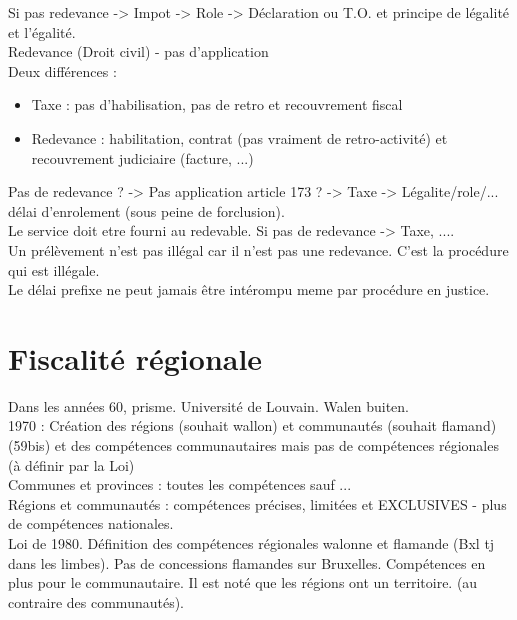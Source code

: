 \documentclass{book}
\begin{document}
Si pas redevance -> Impot -> Role -> Déclaration ou T.O. et principe de légalité et l'égalité.\\

Redevance (Droit civil) - pas d'application \\

Deux différences : \\
\begin{itemize}
\item Taxe : pas d'habilisation, pas de retro et recouvrement fiscal
\item Redevance : habilitation, contrat (pas vraiment de retro-activité) et recouvrement judiciaire (facture, ...)
\end{itemize}
\null
Pas de redevance ? -> Pas application article 173 ? -> Taxe -> Légalite/role/... délai d'enrolement (sous peine de forclusion).\\

Le service doit etre fourni au redevable. Si pas de redevance -> Taxe, ....\\

Un prélèvement n'est pas illégal car il n'est pas une redevance. C'est la procédure qui est illégale.\\

Le délai prefixe ne peut jamais être intérompu meme par procédure en justice.\\


\chapter{Fiscalité régionale}

Dans les années 60, prisme. Université de Louvain. Walen buiten.\\

1970 : Création des régions (souhait wallon) et communautés (souhait flamand) (59bis) et des compétences communautaires mais pas de compétences régionales (à définir par la Loi)\\

Communes et provinces : toutes les compétences sauf ...\\

Régions et communautés : compétences précises, limitées et EXCLUSIVES - plus de compétences nationales.\\

Loi de 1980. Définition des compétences régionales walonne et flamande (Bxl tj dans les limbes). Pas de concessions flamandes sur Bruxelles. Compétences en plus pour le communautaire. Il est noté que les régions ont un territoire. (au contraire des communautés).\\
\end{document}
